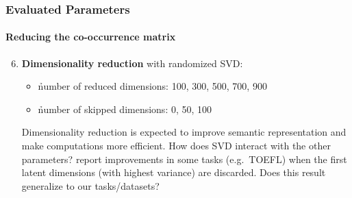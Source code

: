 \documentclass[t]{beamer} %
\begin{document}
\begin{frame}
  \frametitle{Evaluated Parameters}
  \framesubtitle{Reducing the co-occurrence matrix}    

  \begin{enumerate}
    \setcounter{enumi}{5}
  \item \textbf{Dimensionality reduction} with randomized SVD:
    \begin{itemize}
    \item \h{number of reduced dimensions}: 100, 300, 500, 700, 900
    \item \h{number of skipped dimensions}: 0, 50, 100
    \end{itemize}    
    \begin{block}{}\small
      Dimensionality reduction is expected to improve semantic representation and make computations more efficient. How does SVD interact with the other parameters?
      \citet{Bullinaria:Levy:12} report improvements in some tasks (e.g.\ TOEFL) when the first latent dimensions (with highest variance) are discarded. Does this result generalize to our tasks/datasets? 
    \end{block}                  
  \end{enumerate}   
\end{frame}
\end{document}
